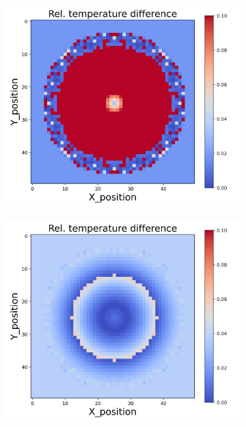 {\begin{figure}[h]
\begin{minipage}{\textwidth}
\begin{subfigure}{0.28\textwidth}
        \end{subfigure}
    \end{minipage}\\
    \begin{minipage}{\textwidth}
        \centering
        \begin{subfigure}{0.28\textwidth}
            \centering
            \includegraphics[width=\textwidth]{figures/raw_data/32/linear/T_bias.jpg}
        \end{subfigure}
        \begin{subfigure}{0.28\textwidth}
            \centering
            \includegraphics[width=\textwidth]{figures/raw_data/33/linear/T_bias.jpg}

\end{subfigure}
\end{minipage}
\end{figure}}
